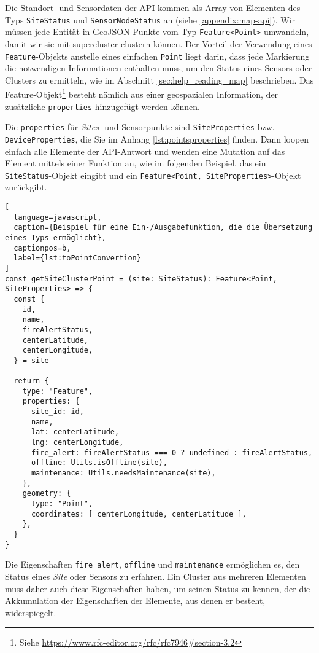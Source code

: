 Die Standort- und Sensordaten der API kommen als Array von Elementen des Typs \lstinline{SiteStatus} und \lstinline{SensorNodeStatus} an (siehe \ref{appendix:map-api}).
Wir müssen jede Entität in GeoJSON-Punkte vom Typ \lstinline{Feature<Point>} umwandeln, damit wir sie mit supercluster clustern können.
Der Vorteil der Verwendung eines \lstinline{Feature}-Objekts anstelle eines einfachen \lstinline{Point} liegt darin, dass jede Markierung die notwendigen Informationen enthalten muss, um den Status eines Sensors oder Clusters zu ermitteln, wie im Abschnitt \ref{sec:help_reading_map} beschrieben.
Das Feature-Objekt\footnote{Siehe \href{https://www.rfc-editor.org/rfc/rfc7946\#section-3.2}{https://www.rfc-editor.org/rfc/rfc7946\#section-3.2}} besteht nämlich aus einer geospazialen Information, der zusätzliche \lstinline{properties} hinzugefügt werden können.

Die \lstinline{properties} für \textit{Sites}- und Sensorpunkte sind \lstinline{SiteProperties} bzw. \lstinline{DeviceProperties}, die Sie im Anhang \ref{lst:pointsproperties} finden.
Dann loopen einfach alle Elemente der API-Antwort und wenden eine Mutation auf das Element mittels einer Funktion an, wie im folgenden Beispiel, das ein \lstinline{SiteStatus}-Objekt eingibt und ein \lstinline{Feature<Point, SiteProperties>}-Objekt zurückgibt.

\begin{lstlisting}[
  language=javascript,
  caption={Beispiel für eine Ein-/Ausgabefunktion, die die Übersetzung eines Typs ermöglicht},
  captionpos=b,
  label={lst:toPointConvertion}
]
const getSiteClusterPoint = (site: SiteStatus): Feature<Point, SiteProperties> => {
  const {
    id,
    name,
    fireAlertStatus,
    centerLatitude,
    centerLongitude,
  } = site

  return {
    type: "Feature",
    properties: {
      site_id: id,
      name,
      lat: centerLatitude,
      lng: centerLongitude,
      fire_alert: fireAlertStatus === 0 ? undefined : fireAlertStatus,
      offline: Utils.isOffline(site),
      maintenance: Utils.needsMaintenance(site),
    },
    geometry: {
      type: "Point",
      coordinates: [ centerLongitude, centerLatitude ],
    },
  }
}
\end{lstlisting}

Die Eigenschaften \lstinline{fire_alert}, \lstinline{offline} und \lstinline{maintenance} ermöglichen es, den Status eines \textit{Site} oder Sensors zu erfahren.
Ein Cluster aus mehreren Elementen muss daher auch diese Eigenschaften haben, um seinen Status zu kennen, der die Akkumulation der Eigenschaften der Elemente, aus denen er besteht, widerspiegelt.

